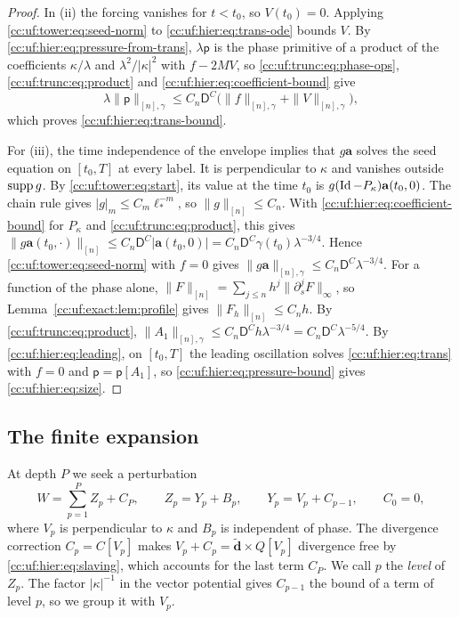 \begin{proof}
In (ii) the forcing vanishes for $t<t_0$, so $V(t_0)=0$.
Applying \eqref{cc:uf:tower:eq:seed-norm} to
\eqref{cc:uf:hier:eq:trans-ode} bounds $V$. By
\eqref{cc:uf:hier:eq:pressure-from-trans}, $\lambda\mathsf p$ is the
phase primitive of a product of the coefficients $\kappa/\lambda$ and
$\lambda^2/|\kappa|^2$ with $f-2MV$, so
\eqref{cc:uf:trunc:eq:phase-ops}, \eqref{cc:uf:trunc:eq:product} and
\eqref{cc:uf:hier:eq:coefficient-bound} give
\begin{equation}\label{cc:uf:hier:eq:pressure-bound}
 \lambda\|\mathsf p\|_{[n],\gamma}
 \le C_n\mathsf D^C\bigl(\|f\|_{[n],\gamma}+\|V\|_{[n],\gamma}\bigr),
\end{equation}
which proves \eqref{cc:uf:hier:eq:trans-bound}.

For (iii), the time independence of the envelope implies that $g\mathbf a$
solves the seed equation on $[t_0,T]$ at every label. It is perpendicular
to $\kappa$ and vanishes outside $\operatorname{supp} g$. By
\eqref{cc:uf:tower:eq:start}, its value at
the time $t_0$ is $g(\operatorname{Id}-P_\kappa)\mathbf a(t_0,0)$. The chain rule
gives $|g|_m\le C_m\ell_*^{-m}$, so $\|g\|_{[n]}\le C_n$. With
\eqref{cc:uf:hier:eq:coefficient-bound} for
$P_\kappa$ and \eqref{cc:uf:trunc:eq:product}, this gives
$\|g\mathbf a(t_0,\cdot)\|_{[n]}
\le C_n\mathsf D^C|\mathbf a(t_0,0)|=C_n\mathsf D^C\gamma(t_0)\lambda^{-3/4}$.
Hence \eqref{cc:uf:tower:eq:seed-norm} with $f=0$ gives
$\|g\mathbf a\|_{[n],\gamma}\le C_n\mathsf D^C\lambda^{-3/4}$.
For a function of the phase alone,
$\|F\|_{[n]}=\sum_{j\le n}h^j\|\partial_s^jF\|_\infty$, so
Lemma~\ref{cc:uf:exact:lem:profile} gives $\|F_h\|_{[n]}\le C_nh$.
By \eqref{cc:uf:trunc:eq:product},
$\|A_1\|_{[n],\gamma}\le C_n\mathsf D^C h\lambda^{-3/4}
=C_n\mathsf D^C\lambda^{-5/4}$. By \eqref{cc:uf:hier:eq:leading}, on
$[t_0,T]$ the leading oscillation solves \eqref{cc:uf:hier:eq:trans}
with $f=0$ and $\mathsf p=\mathsf p[A_1]$, so
\eqref{cc:uf:hier:eq:pressure-bound} gives \eqref{cc:uf:hier:eq:size}.
\end{proof}

\subsection{The finite expansion}\label{cc:uf:sec:hierarchy}
At depth $P$ we seek a perturbation
\[
 W=\sum_{p=1}^P Z_p+C_P,\qquad
 Z_p=Y_p+B_p,\qquad Y_p=V_p+C_{p-1},\qquad C_0=0,
\]
where $V_p$ is perpendicular to $\kappa$ and $B_p$ is independent of phase.
The divergence correction $C_p=C[V_p]$ makes
$V_p+C_p=\widetilde{\mathbf d}\times Q[V_p]$ divergence free by
\eqref{cc:uf:hier:eq:slaving}, which accounts for the last term $C_P$.
We call $p$ the \emph{level} of $Z_p$. The factor $|\kappa|^{-1}$
in the vector potential gives $C_{p-1}$ the bound of a term of
level $p$, so we group it with $V_p$.

